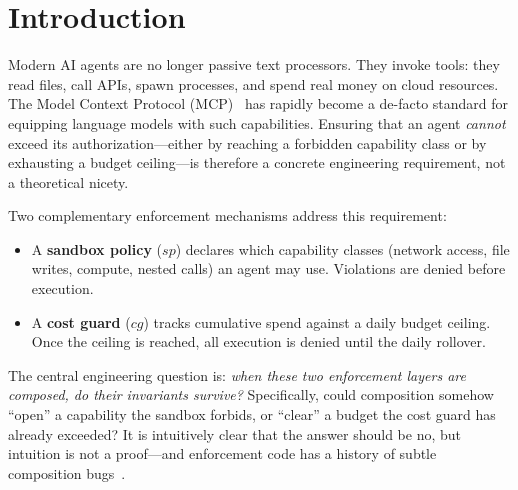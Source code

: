 \documentclass[sigconf]{acmart}
\newcommand{\SP}{\mathit{sp}}
\newcommand{\CG}{\mathit{cg}}
\begin{document}


\maketitle

\section{Introduction}
\label{sec:intro}

Modern AI agents are no longer passive text processors.  They invoke tools: they
read files, call APIs, spawn processes, and spend real money on cloud resources.
The Model Context Protocol (MCP)~\cite{mcp-spec,hou2025mcp} has rapidly
become a de-facto standard for equipping language models with such capabilities.
Ensuring that an agent \emph{cannot} exceed its authorization---either by
reaching a forbidden capability class or by exhausting a budget ceiling---is
therefore a concrete engineering requirement, not a theoretical nicety.

Two complementary enforcement mechanisms address this requirement:

\begin{itemize}
  \item A \textbf{sandbox policy} ($\SP$) declares which capability classes
        (network access, file writes, compute, nested calls) an agent may use.
        Violations are denied before execution.
  \item A \textbf{cost guard} ($\CG$) tracks cumulative spend against a daily
        budget ceiling.  Once the ceiling is reached, all execution is denied
        until the daily rollover.
\end{itemize}

The central engineering question is: \emph{when these two enforcement layers
are composed, do their invariants survive?}  Specifically, could composition
somehow ``open'' a capability the sandbox forbids, or ``clear'' a budget the
cost guard has already exceeded?  It is intuitively clear that the answer
should be no, but intuition is not a proof---and enforcement code has a
history of subtle composition bugs~\cite{wahbe1993efficient,yee2009native}.
\end{document}
